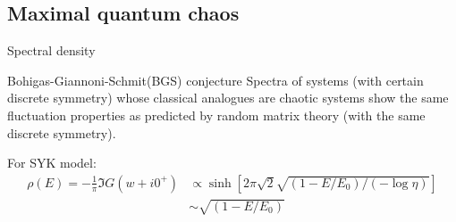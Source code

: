 \subsection{Maximal quantum chaos}
\begin{frame}{Spectral density}
\begin{block}{Bohigas-Giannoni-Schmit(BGS) conjecture}
Spectra of systems (with certain discrete symmetry) whose classical analogues are chaotic systems show the same fluctuation properties as predicted by random matrix theory (with the same discrete symmetry).
\end{block}

\vspace{1cm}
\qquad For SYK model:
$$
\begin{aligned}
    \rho(E) = -\frac{1}{\pi} \Im G(w+i0^{+}) &\propto \sinh \left[2 \pi \sqrt{2} \sqrt{\left(1-E / E_{0}\right) /(-\log \eta)}\right] \\
    &\sim \sqrt{\left(1-E / E_{0}\right)}
\end{aligned}
$$
\end{frame}
